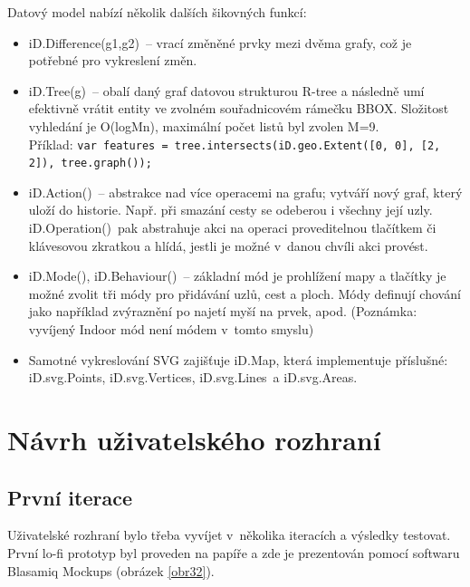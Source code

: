 Datový model nabízí několik dalších šikovných funkcí:

\begin{itemize}

\item
  iD.Difference(g1,g2)~-- vrací změněné prvky mezi dvěma grafy, což je potřebné pro vykreslení změn.
\item
  iD.Tree(g)~-- obalí daný graf datovou strukturou R-tree a následně umí efektivně vrátit entity ve zvolném souřadnicovém rámečku BBOX. Složitost vyhledání je O(logMn), maximální počet listů byl zvolen M=9.\\
  Příklad: 
\texttt{var features = tree.intersects(iD.geo.Extent([0, 0], [2, 2]), tree.graph());}
\item
  iD.Action()~-- abstrakce nad více operacemi na grafu; vytváří nový graf, který uloží do historie. Např. při smazání cesty se odeberou i všechny její uzly. iD.Operation()~pak abstrahuje akci na operaci proveditelnou tlačítkem či klávesovou zkratkou a hlídá, jestli je možné v~danou chvíli akci provést.
\item
  iD.Mode(), iD.Behaviour()~-- základní mód je prohlížení mapy a tlačítky je možné zvolit tři módy pro přidávání uzlů, cest a ploch. Módy definují chování jako například zvýraznění po najetí myší na prvek, apod. (Poznámka: vyvíjený Indoor mód není módem v~tomto  smyslu)
\item
  Samotné vykreslování SVG zajišťuje iD.Map, která implementuje příslušné: iD.svg.Points, iD.svg.Vertices, iD.svg.Lines~a iD.svg.Areas.
\end{itemize}

\section{Návrh uživatelského rozhraní}\label{nuxe1vrh-uux17eivatelskuxe9ho-rozhranuxed}

\subsection{První iterace}\label{prvnuxed-iterace}

Uživatelské rozhraní bylo třeba vyvíjet v~několika iteracích a výsledky testovat. První lo-fi prototyp byl proveden na papíře a zde je prezentován pomocí softwaru Blasamiq Mockups (obrázek \ref{obr32}).

